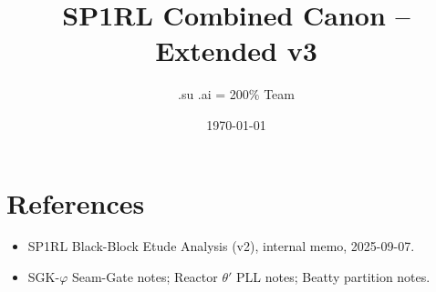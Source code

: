 \documentclass[11pt,oneside]{book}
\title{SP1RL Combined Canon -- Extended v3}
\author{.su \times .ai = 200\% Team}
\date{\today}
\begin{document}
\frontmatter
\maketitle
\tableofcontents
\listoffigures

\mainmatter











\backmatter
\chapter*{References}
\begin{itemize}
  \item SP1RL Black-Block Etude Analysis (v2), internal memo, 2025-09-07.  %
  \item SGK-$\varphi$ Seam-Gate notes; Reactor $\theta'$ PLL notes; Beatty partition notes.
\end{itemize}
\end{document}
